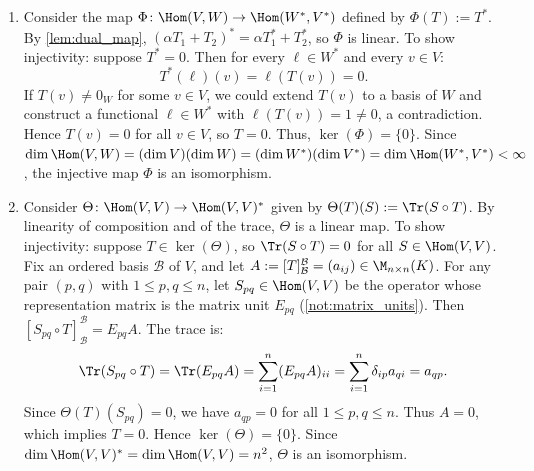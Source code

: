 \begin{exercisesolution}
\label{sol:hom_dual_isomorphism_trace_pairing}
\begin{enumerate}[label=\textbf{(\alph*)}]
    \item Consider the map $\Phi \colon \Hom(V, W) \to \Hom(W^*, V^*)$ defined by $\Phi(T) := T^*$.
    By \cref{lem:dual_map}, $(\alpha T_1 + T_2)^* = \alpha T_1^* + T_2^*$, so $\Phi$ is linear.
    To show injectivity: suppose $T^* = 0$. Then for every $\ell \in W^*$ and every $v \in V$:
    \[
    T^*(\ell)(v) = \ell(T(v)) = 0.
    \]
    If $T(v) \ne 0_W$ for some $v \in V$, we could extend $T(v)$ to a basis of $W$ and construct a functional $\ell \in W^*$ with $\ell(T(v)) = 1 \ne 0$, a contradiction.
    Hence $T(v) = 0$ for all $v \in V$, so $T = 0$. Thus, $\ker(\Phi) = \{0\}$.
    Since $\dim \Hom(V, W) = (\dim V)(\dim W) = (\dim W^*)(\dim V^*) = \dim \Hom(W^*, V^*) < \infty$, the injective map $\Phi$ is an isomorphism.

    \item Consider $\Theta \colon \Hom(V, V) \to \Hom(V, V)^*$ given by $\Theta(T)(S) := \Tr(S \circ T)$.
    By linearity of composition and of the trace, $\Theta$ is a linear map.
    To show injectivity: suppose $T \in \ker(\Theta)$, so $\Tr(S \circ T) = 0$ for all $S \in \Hom(V, V)$.
    Fix an ordered basis $\mathcal{B}$ of $V$, and let $A := [T]_{\mathcal{B}}^{\mathcal{B}} = (a_{ij}) \in \M_{n \times n}(K)$.
    For any pair $(p, q)$ with $1 \le p, q \le n$, let $S_{pq} \in \Hom(V, V)$ be the operator whose representation matrix is the matrix unit $E_{pq}$ (\cref{not:matrix_units}).
    Then $[S_{pq} \circ T]_{\mathcal{B}}^{\mathcal{B}} = E_{pq} A$.
    The trace is:
    \[
    \Tr(S_{pq} \circ T) = \Tr(E_{pq} A) = \sum_{i=1}^n (E_{pq} A)_{ii} = \sum_{i=1}^n \delta_{ip} a_{qi} = a_{qp}.
    \]
    Since $\Theta(T)(S_{pq}) = 0$, we have $a_{qp} = 0$ for all $1 \le p, q \le n$.
    Thus $A = 0$, which implies $T = 0$.
    Hence $\ker(\Theta) = \{0\}$. Since $\dim \Hom(V, V)^* = \dim \Hom(V, V) = n^2$, $\Theta$ is an isomorphism. \qedhere
\end{enumerate}
\end{exercisesolution}

